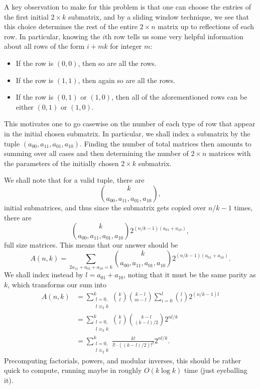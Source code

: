 \documentclass[a4paper, 12pt]{article}
\begin{document}
\begin{solution}
    A key observation to make for this problem is that one can choose the entries of the first initial \( 2 \times k \) submatrix, and by a sliding window technique, we see that this choice determines the rest of the entire \( 2 \times n \) matrix up to reflections of each row. In particular, knowing the \( i \)th row tells us some very helpful information about all rows of the form \( i + mk \) for integer \( m \):
    \begin{itemize}
        \item If the row is \( (0, 0) \), then so are all the rows.
        \item If the row is \( (1, 1) \), then again so are all the rows.
        \item If the row is \( (0, 1) \) or \( (1, 0) \), then all of the aforementioned rows can be either \( (0, 1) \) or \( (1, 0) \).
    \end{itemize}
    This motivates one to go casewise on the number of each type of row that appear in the initial chosen submatrix. In particular, we shall index a submatrix by the tuple \( (a_{00}, a_{11}, a_{01}, a_{10}) \). Finding the number of total matrices then amounts to summing over all cases and then determining the number of \( 2 \times n \) matrices with the parameters of the initially chosen \( 2 \times k \) submatrix.

    We shall note that for a valid tuple, there are
    \[
        \binom{k}{a_{00}, a_{11}, a_{01}, a_{10}}
    ,\]
    initial submatrices, and thus since the submatrix gets copied over \( n/k - 1 \) times, there are
    \[
        \binom{k}{a_{00}, a_{11}, a_{01}, a_{10}} 2^{(n/k - 1)(a_{01} + a_{10})}
    ,\]
    full size matrices. This means that our answer should be
    \[
        A(n, k) = \sum_{2a_{11} + a_{01} + a_{10} = k} \binom{k}{a_{00}, a_{11}, a_{01}, a_{10}} 2^{(n/k - 1)(a_{01} + a_{10})}
    .\]
    We shall index instead by \( l = a_{01} + a_{10} \), noting that it must be the same parity as \( k \), which transforms our sum into
    \begin{align*}
        A(n, k) &= \sum_{\substack{l = 0, \\ l \equiv_2 k}}^{k} \binom{k}{l} \binom{k - l}{m - l} \sum_{i = 0}^{l} \binom{l}{i} 2^{(n/k - 1)l} \\
        &= \sum_{\substack{l = 0, \\ l \equiv_2 k}}^{k} \binom{k}{l} \binom{k - l}{(k-l)/2} 2^{nl/k} \\
        &= \sum_{\substack{l = 0, \\ l \equiv_2 k}}^{k} \frac{k!}{l! \cdot ((k-l)/2)!^2} 2^{nl/k}
    .\end{align*}
    Precomputing factorials, powers, and modular inverses, this should be rather quick to compute, running maybe in roughly \( O(k \log{k}) \) time (just eyeballing it).
\end{solution}
\end{document}
